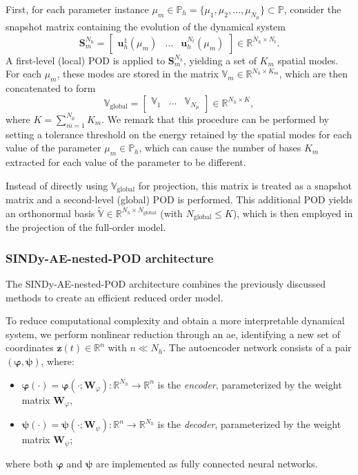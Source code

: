 \documentclass[reqno]{amsart}[standalone]
\theoremstyle{definition}
\theoremstyle{remark}
\newcommand{\R}{\mathbb{R}}
\newcommand{\bs}{\boldsymbol}
\begin{document}
First, for each parameter instance $ \mu_m \in \mathbb{P}_h = \{\mu_1, \mu_2, \dots, \mu_{N_\mu}\} \subset \mathbb{P} $, consider the snapshot matrix containing the evolution of the dynamical system
\[
\bs{S}^{N_h}_m =
\begin{bmatrix}
\bs{u}^1_h(\mu_m) & \ldots & \bs{u}^{N_t}_h(\mu_m)
\end{bmatrix}
\in \mathbb{R}^{N_h \times N_t}.
\]
%
A first-level (local) POD is applied to $ \bs{S}^{N_h}_m $, yielding a set of $ K_m $ spatial modes. For each $\mu_m$, these modes are stored in the matrix $ \mathbb{V}_m \in \mathbb{R}^{N_h \times K_m}$, which are then concatenated to form
\begin{equation}\label{eqNESTED_POD_global}
\mathbb{V}_{\text{global}} =
\begin{bmatrix}
\mathbb{V}_1 & \dots & \mathbb{V}_{N_\mu}
\end{bmatrix}
\in \mathbb{R}^{N_h \times K},
\end{equation}
where $ K = \sum_{m=1}^{N_\mu} K_m $. We remark that this procedure can be performed by setting a tolerance threshold on the energy retained by the spatial modes for each value of the parameter $\mu_m \in \mathbb{P}_h$, which can cause the number of bases $K_m$ extracted for each value of the parameter to be different.
%

Instead of directly using $ \mathbb{V}_{\text{global}} $  for projection, this matrix is treated as a snapshot matrix and a second-level (global) POD is performed. This additional POD yields an orthonormal basis $ \tilde{\mathbb{V}} \in \mathbb{R}^{N_h\times N_{\text{global}}} $ (with $ N_{\text{global}} \le K $), which is then employed in the projection of the full-order model.

\subsubsection{SINDy-AE-nested-POD architecture}
The SINDy-AE-nested-POD architecture combines the previously discussed methods to create an efficient reduced order model.
%

To reduce computational complexity and obtain a more interpretable dynamical system, we perform nonlinear reduction through an \gls{ae}, identifying a new set of coordinates $\bs{z}(t)\in\R^n$ with $n\ll N_h$.
The autoencoder network consists of a pair $(\bs{\varphi},\bs{\psi})$, where:
\begin{itemize}
    \item $\bs{\varphi}(\cdot) = \bs{\varphi}(\cdot; \bs{W}_\varphi): \R^{N_h}\to\R^n$ is the \textit{encoder}, parameterized by the weight matrix $\bs{W}_\varphi$,
    \item $\bs{\psi}(\cdot) = \bs{\psi}(\cdot; \bs{W}_\psi): \R^n\to\R^{N_h}$ is the \textit{decoder}, parameterized by the weight matrix $\bs{W}_\psi$;
\end{itemize}
where both $\bs{\varphi}$ and $\bs{\psi}$ are implemented as fully connected neural networks.
\end{document}
